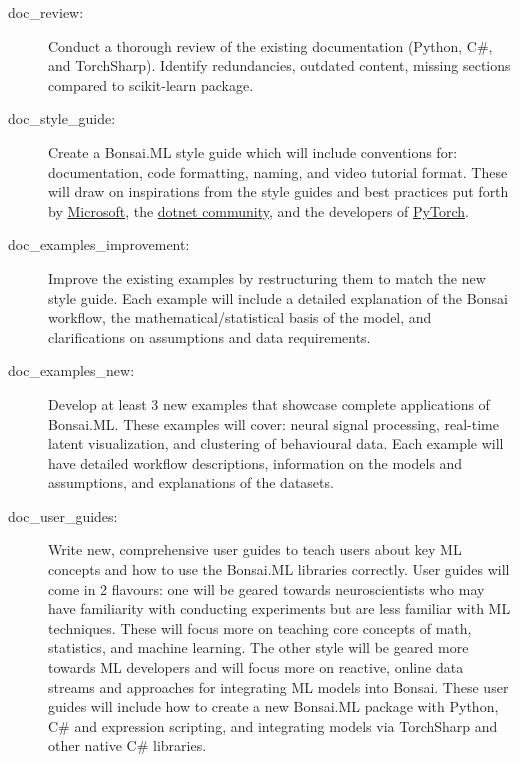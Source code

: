 \begin{description}

    \item[doc\_review:] Conduct a thorough review of the existing documentation (Python, C\#, and TorchSharp). Identify redundancies, outdated content, missing sections compared to scikit-learn package.

    \item[doc\_style\_guide:] Create a Bonsai.ML style guide which will include conventions for: documentation, code formatting, naming, and video tutorial format. These will draw on inspirations from the style guides and best practices put forth by \href{https://learn.microsoft.com/en-us/dotnet/csharp/fundamentals/coding-style/coding-conventions}{Microsoft}, the \href{https://github.com/dotnet/runtime/blob/main/docs/coding-guidelines/coding-style.md}{dotnet community}, and the developers of \href{https://github.com/pytorch/pytorch/blob/main/CONTRIBUTING.md}{PyTorch}.
    
    \item[doc\_examples\_improvement:] Improve the existing examples by restructuring them to match the new style guide. Each example will include a detailed explanation of the Bonsai workflow, the mathematical/statistical basis of the model, and clarifications on assumptions and data requirements.

    \item[doc\_examples\_new:] Develop at least 3 new examples that showcase complete applications of Bonsai.ML. These examples will cover: neural signal processing, real-time latent visualization, and clustering of behavioural data. Each example will have detailed workflow descriptions, information on the models and assumptions, and explanations of the datasets.

    \item[doc\_user\_guides:] Write new, comprehensive user guides to teach users about key ML concepts and how to use the Bonsai.ML libraries correctly. User guides will come in 2 flavours: one will be geared towards neuroscientists who may have familiarity with conducting experiments but are less familiar with ML techniques. These will focus more on teaching core concepts of math, statistics, and machine learning. The other style will be geared more towards ML developers and will focus more on reactive, online data streams and approaches for integrating ML models into Bonsai. These user guides will include how to create a new Bonsai.ML package with Python, C\# and expression scripting, and integrating models via TorchSharp and other native C\# libraries.
    

\end{description}
